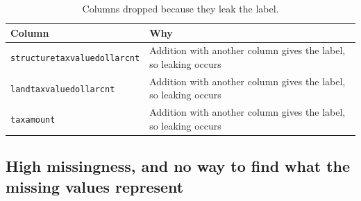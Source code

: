 \documentclass[sigconf,nonacm,10pt]{acmart}
\begin{document}
\begin{table}[h]
\caption{Columns dropped because they leak the label.}
\small
\begin{tabularx}{\columnwidth}{@{}lX@{}}
\toprule
Column & Why \\
\midrule
\texttt{structuretaxvaluedollarcnt} & Addition with another column gives the label, so leaking occurs \\
\texttt{landtaxvaluedollarcnt} & Addition with another column gives the label, so leaking occurs \\
\texttt{taxamount} & Addition with another column gives the label, so leaking occurs \\
\bottomrule
\end{tabularx}
\end{table}

\subsection{High missingness, and no way to find what the missing values represent}
\end{document}
